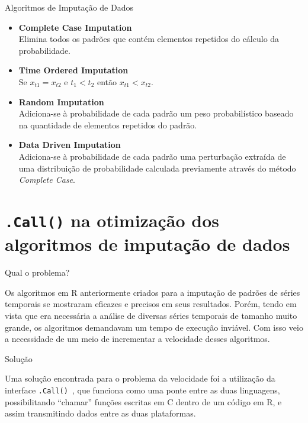 \documentclass{beamer}
\begin{document}
\begin{frame}{Algoritmos de Imputação de Dados}

\begin{itemize}
    \item \textbf{Complete Case Imputation}\\
    Elimina todos os padrões que contém elementos repetidos do cálculo da probabilidade.
    \item \textbf{Time Ordered Imputation}\\
    Se $x_{t1} = x_{t2}$ e $t_{1} < t_{2}$ então $x_{t1} < x_{t2}$.
    \item \textbf{Random Imputation}\\
    Adiciona-se à probabilidade de cada padrão um peso probabilístico baseado na quantidade de elementos repetidos do padrão.
    \item \textbf{Data Driven Imputation}\\
    Adiciona-se à probabilidade de cada padrão uma perturbação extraída de uma distribuição de probabilidade calculada previamente através do método \textit{Complete Case}.
\end{itemize}
    
\end{frame}

\section{\texttt{.Call()} na otimização dos algoritmos de imputação de dados}

\begin{frame}{Qual o problema?}

Os algoritmos em R anteriormente criados para a imputação de padrões de séries temporais se mostraram eficazes e precisos em seus resultados. 
Porém, tendo em vista que era necessária a análise de diversas séries temporais de tamanho muito grande, os algoritmos demandavam um tempo de execução inviável. 
Com isso veio a necessidade de um meio de incrementar a velocidade desses algoritmos.
    
\end{frame}

\begin{frame}{Solução}
    
Uma solução encontrada para o problema da velocidade foi a utilização da interface \texttt{.Call()}~\cite{Speed}, que funciona como uma ponte entre as duas linguagens, possibilitando “chamar” funções escritas em C dentro de um código em R, e assim transmitindo dados entre as duas plataformas.
    
\end{frame}
\end{document}

